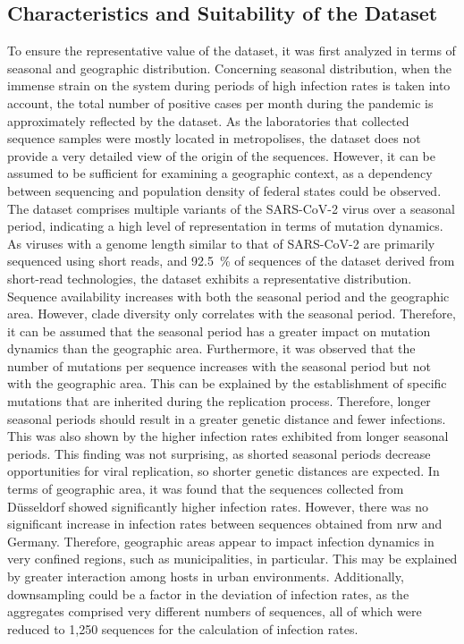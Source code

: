\subsection{Characteristics and Suitability of the Dataset}
To ensure the representative value of the dataset, it was first analyzed in terms of seasonal and geographic distribution. Concerning seasonal distribution, when the immense strain on the system during periods of high infection rates is taken into account, the total number of positive cases per month during the pandemic is approximately reflected by the dataset. 
As the laboratories that collected sequence samples were mostly located in metropolises, the dataset does not provide a very detailed view of the origin of the sequences. However, it can be assumed to be sufficient for examining a geographic context, as a dependency between sequencing and population density of federal states could be observed.
The dataset comprises multiple variants of the SARS-CoV-2 virus over a seasonal period, indicating a high level of representation in terms of mutation dynamics. As viruses with a genome length similar to that of SARS-CoV-2 are primarily sequenced using short reads, and 92.5~\% of sequences of the dataset derived from short-read technologies, the dataset exhibits a representative distribution.
Sequence availability increases with both the seasonal period and the geographic area. However, clade diversity only correlates with the seasonal period. Therefore, it can be assumed that the seasonal period has a greater impact on mutation dynamics than the geographic area.
Furthermore, it was observed that the number of mutations per sequence increases with the seasonal period but not with the geographic area. This can be explained by the establishment of specific mutations that are inherited during the replication process. Therefore, longer seasonal periods should result in a greater genetic distance and fewer infections. This was also shown by the higher infection rates exhibited from longer seasonal periods. This finding was not surprising, as shorted seasonal periods decrease opportunities for viral replication, so shorter genetic distances are expected. In terms of geographic area, it was found that the sequences collected from Düsseldorf showed significantly higher infection rates. However, there was no significant increase in infection rates between sequences obtained from \acrshort{nrw} and Germany. Therefore, geographic areas appear to impact infection dynamics in very confined regions, such as municipalities, in particular. This may be explained by greater interaction among hosts in urban environments. Additionally, downsampling could be a factor in the deviation of infection rates, as the aggregates comprised very different numbers of sequences, all of which were reduced to 1,250 sequences for the calculation of infection rates.

